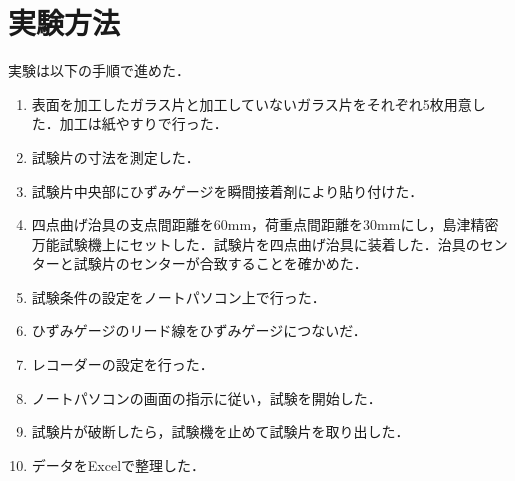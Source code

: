 \section{実験方法}
実験は以下の手順で進めた．

\begin{enumerate}
    \item 表面を加工したガラス片と加工していないガラス片をそれぞれ5枚用意した．加工は紙やすりで行った．
    \item 試験片の寸法を測定した．
    \item 試験片中央部にひずみゲージを瞬間接着剤により貼り付けた．
    \item 四点曲げ治具の支点間距離を60mm，荷重点間距離を30mmにし，島津精密万能試験機上にセットした．試験片を四点曲げ治具に装着した．治具のセンターと試験片のセンターが合致することを確かめた．
    \item 試験条件の設定をノートパソコン上で行った．
    \item ひずみゲージのリード線をひずみゲージにつないだ．
    \item レコーダーの設定を行った．
    \item ノートパソコンの画面の指示に従い，試験を開始した．
    \item 試験片が破断したら，試験機を止めて試験片を取り出した．
    \item データをExcelで整理した．
\end{enumerate}